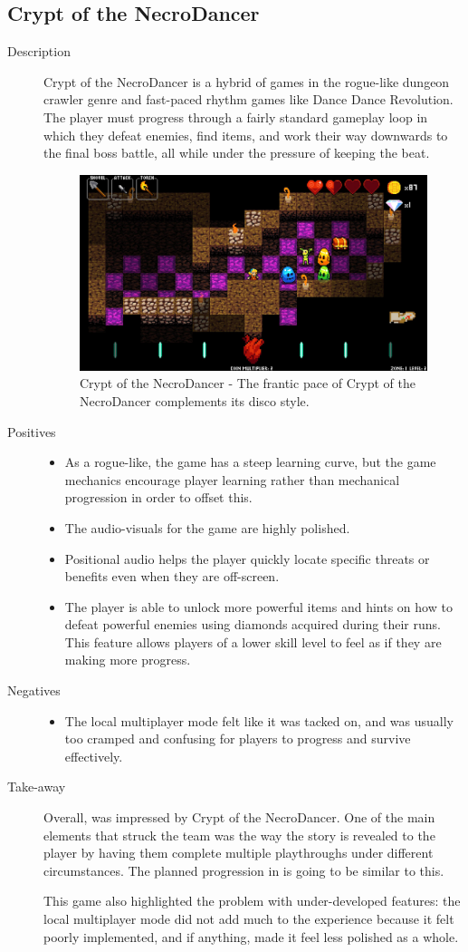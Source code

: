\clearpage
\subsection{Crypt of the NecroDancer}
\begin{description}
\item[Description]{Crypt of the NecroDancer is a hybrid of games in the rogue-like dungeon crawler genre and fast-paced rhythm games like Dance Dance Revolution. The player must progress through a fairly standard gameplay loop in which they defeat enemies, find items, and work their way downwards to the final boss battle, all while under the pressure of keeping the beat.

\begin{figure}[htb]
	\centering\includegraphics[width=.25\linewidth]{images/game_cotn}
	\caption{Crypt of the NecroDancer - The frantic pace of Crypt of the NecroDancer complements its disco style.}
	\label{fig:crypt_of_the_necrodancer}
\end{figure}}
\item[Positives]{
\begin{itemize}
\item{As a rogue-like, the game has a steep learning curve, but the game mechanics encourage player learning rather than mechanical progression in order to offset this.}
\item{The audio-visuals for the game are highly polished.}
\item{Positional audio helps the player quickly locate specific threats or benefits even when they are off-screen.}
\item{The player is able to unlock more powerful items and hints on how to defeat powerful enemies using diamonds acquired during their runs. This feature allows players of a lower skill level to feel as if they are making more progress.}
\end{itemize}
}
\item[Negatives]{
\begin{itemize}
\item{The local multiplayer mode felt like it was tacked on, and was usually too cramped and confusing for players to progress and survive effectively.}
\end{itemize}
}
\item[Take-away]{Overall, \ourteam{} was impressed by Crypt of the NecroDancer. One of the main elements that struck the team was the way the story is revealed to the player by having them complete multiple playthroughs under different circumstances. The planned progression in \ourgame{} is going to be similar to this.

This game also highlighted the problem with under-developed features: the local multiplayer mode did not add much to the experience because it felt poorly implemented, and if anything, made it feel less polished as a whole.}
\end{description}




